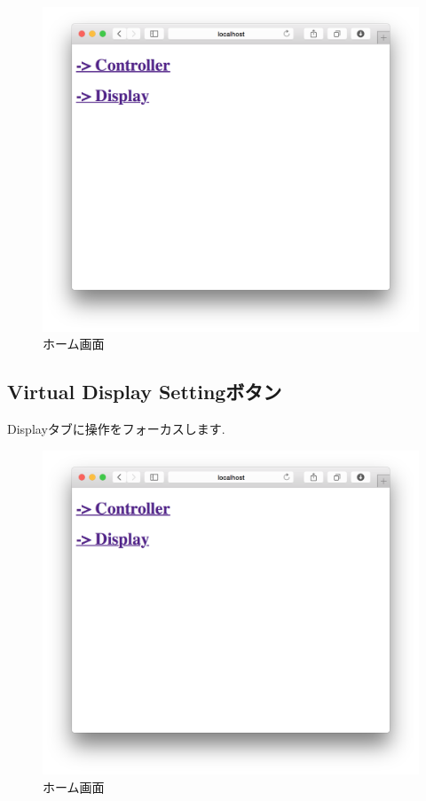 \documentclass[a4paper,10pt,oneside]{jsbook}
\begin{document}
\begin{figure}[htbp]
	\begin{center}
		\includegraphics[width=11.5cm]{image/home.png}
	\end{center}
	\caption{ホーム画面}
	\label{fig:home}
\end{figure}


\subsection{Virtual Display Settingボタン}
Displayタブに操作をフォーカスします.\\

\begin{figure}[htbp]
	\begin{center}
		\includegraphics[width=11.5cm]{image/home.png}
	\end{center}
	\caption{ホーム画面}
	\label{fig:home}
\end{figure}
\end{document}

